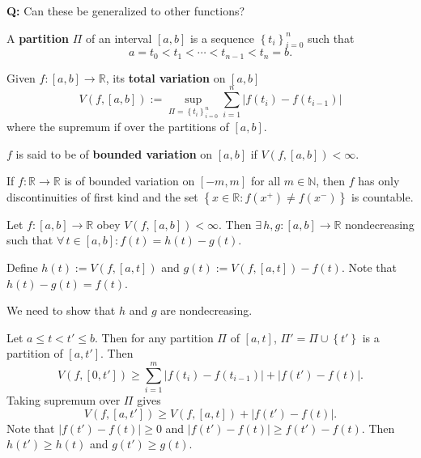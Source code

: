 \documentclass{notes}
\begin{document}
  {\boldmath \bfseries  Q:} Can these be generalized to other functions?

  \begin{defn}
    A {\boldmath \bfseries partition} $\Pi$ of an interval $[a, b]$ is a sequence $\left \{ t_i \right \}_{i = 0}^n$ such that 
    \[
      a = t_0 < t_{1} < \cdots < t_{n - 1} < t_n = b.
    \]
  \end{defn}
  
  \begin{defn}
    Given $f \colon [a, b] \to \mathbb R$, its {\boldmath \bfseries total variation} on $[a, b]$
    \[
      V(f, [a, b]) := \sup_{\Pi = \left \{ t_i \right \}_{i = 0}^n} \sum_{i = 1}^n \left | f(t_i) - f(t_{i - 1}) \right | 
    \]
    where the supremum if over the partitions of $[a, b]$.
  \end{defn}
  
  \begin{defn}
    $f$ is said to be of {\boldmath \bfseries bounded variation} on $[a, b]$ if $V(f, [a, b]) < \infty$.
  \end{defn}
  
  \begin{lem}
    If $f \colon \mathbb R \to \mathbb R$ is of bounded variation on $[-m, m]$ for all $m \in \mathbb N$, then $f$ has only discontinuities of first kind and the set $\left \{ x \in \mathbb R : f(x^+) \neq f(x^-) \right \}$ is countable.
  \end{lem}
  
  \begin{thm}
    Let $f \colon [a, b] \to \mathbb R$ obey $V(f, [a, b]) < \infty$.
    Then $\exists \, h, g \colon [a, b] \to \mathbb R$ nondecreasing such that $\forall \, t \in [a, b]: f(t) = h(t) - g(t)$.
  \end{thm}
  
  \begin{prf}
    Define $h(t) := V(f, [a, t])$ and $g(t) := V(f, [a, t]) - f(t)$.
    Note that $h(t) - g(t) = f(t)$.

    We need to show that $h$ and $g$ are nondecreasing.
    
    Let $a \leq t < t' \leq b$.
    Then for any partition $\Pi$ of $[a, t]$, $\Pi' = \Pi \cup \left \{ t' \right \}$ is a partition of $[a, t']$.
    Then 
    \begin{equation}
      V(f, [0, t']) \geq \sum_{i = 1}^m \left | f(t_i) - f(t_{i - 1}) \right | + \left | f(t') - f(t) \right |.
    \end{equation}
    Taking supremum over $\Pi$ gives 
    \begin{equation}
      V(f, [a, t']) \geq V(f, [a, t]) + \left | f(t') - f(t) \right |.
    \end{equation}
    Note that $\left | f(t') - f(t) \right | \geq 0$ and $\left | f(t') - f(t) \right | \geq f(t') - f(t)$.
    Then $h(t') \geq h(t)$ and $g(t') \geq g(t)$.
  \end{prf}
  
\end{document}
